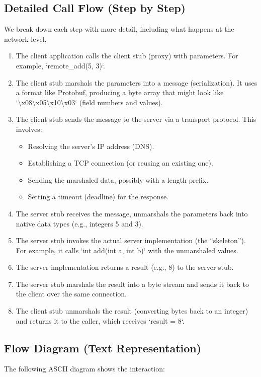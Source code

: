 \documentclass[10pt,a4paper]{article}
\begin{document}
\subsection{Detailed Call Flow (Step by Step)}
We break down each step with more detail, including what happens at the network level.

\begin{enumerate}
    \item The client application calls the client stub (proxy) with parameters. For example, `remote\_add(5, 3)`.
    \item The client stub marshals the parameters into a message (serialization). It uses a format like Protobuf, producing a byte array that might look like `\textbackslash x08\textbackslash x05\textbackslash x10\textbackslash x03` (field numbers and values).
    \item The client stub sends the message to the server via a transport protocol. This involves:
        \begin{itemize}
            \item Resolving the server’s IP address (DNS).
            \item Establishing a TCP connection (or reusing an existing one).
            \item Sending the marshaled data, possibly with a length prefix.
            \item Setting a timeout (deadline) for the response.
        \end{itemize}
    \item The server stub receives the message, unmarshals the parameters back into native data types (e.g., integers 5 and 3).
    \item The server stub invokes the actual server implementation (the “skeleton”). For example, it calls `int add(int a, int b)` with the unmarshaled values.
    \item The server implementation returns a result (e.g., 8) to the server stub.
    \item The server stub marshals the result into a byte stream and sends it back to the client over the same connection.
    \item The client stub unmarshals the result (converting bytes back to an integer) and returns it to the caller, which receives `result = 8`.
\end{enumerate}

\subsection{Flow Diagram (Text Representation)}
The following ASCII diagram shows the interaction:
\end{document}
